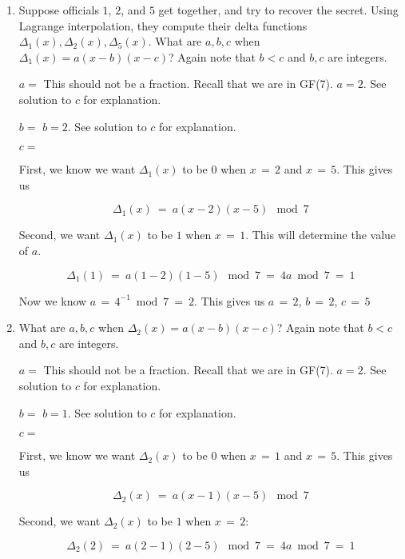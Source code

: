 \documentclass[11pt, preview]{standalone} %
\begin{document}
\begin{enumerate}
\begin{enumerate}
 \item Suppose officials $1$, $2$, and $5$ get together, and try to recover the secret. Using Lagrange interpolation, they compute their delta functions $\Delta_1(x), \Delta_2(x), \Delta_5(x)$. What are $a,b,c$ when $\Delta_1(x) = a(x-b)(x-c)$? Again note that $b < c$ and $b,c$ are integers.
  \begin{Freeform}{2}
 $a = $
 \Hint This should not be a fraction. Recall that we are in GF(7).
 \Solution $a = 2$. See solution to $c$ for explanation.
 \end{Freeform}
  \begin{Freeform}{2}
 $b = $
 \Solution $b = 2$. See solution to $c$ for explanation.
 \end{Freeform}
  \begin{Freeform}{5}
 $c = $

 \Solution First, we know we want $\Delta_1(x)$ to be $0$ when $x\, =\, 2$ and $x\, =\, 5$. This gives us 

 $$\Delta_1(x)\ =\ a(x - 2)(x - 5)\ \bmod 7$$

 Second, we want $\Delta_1(x)$ to be $1$ when $x\, =\, 1$. This will determine the value of $a$.

 $$\Delta_1(1)\ =\ a(1 - 2)(1 - 5)\ \bmod 7\ =\ 4 a \bmod 7\ =\ 1$$

 Now we know $a\, =\, 4^{-1} \bmod 7\ =\ 2$. This gives us $a\, =\, 2$, $b\, =\, 2$, $c\, =\, 5$
 \end{Freeform}
 
 \item What are $a,b,c$ when $\Delta_2(x) = a(x-b)(x-c)$? Again note that $b < c$ and $b,c$ are integers.
  \begin{Freeform}{2}
 $a = $
 \Hint This should not be a fraction. Recall that we are in GF(7).
 \Solution $a = 2$. See solution to $c$ for explanation.
 \end{Freeform}
  \begin{Freeform}{1}
 $b = $
 \Solution $b = 1$. See solution to $c$ for explanation.
 \end{Freeform}
  \begin{Freeform}{5}
 $c = $

 \Solution First, we know we want $\Delta_2(x)$ to be $0$ when $x\, =\, 1$ and $x\, =\, 5$. This gives us 

 $$\Delta_2(x)\ =\ a(x - 1)(x - 5)\ \bmod 7$$

 Second, we want $\Delta_2(x)$ to be $1$ when $x\, =\, 2$:

 $$\Delta_2(2)\ =\ a(2 - 1)(2 - 5)\ \bmod 7\ =\ 4a \bmod 7\ =\ 1$$


\end{Freeform}
\end{enumerate}
\end{enumerate}
\end{document}
